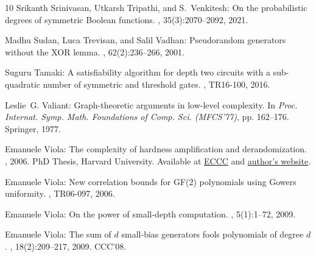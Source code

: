 \documentclass[11pt]{article}
\begin{document}
\begin{thebibliography}{10}
{\sc Srikanth Srinivasan, Utkarsh Tripathi, and S.~Venkitesh}: On the
  probabilistic degrees of symmetric {B}oolean functions.
, 35(3):2070--2092, 2021.

{\sc Madhu Sudan, Luca Trevisan, and Salil Vadhan}: Pseudorandom generators
  without the {XOR} lemma.
, 62(2):236--266, 2001.

{\sc Suguru Tamaki}: A satisfiability algorithm for depth two circuits with a
  sub-quadratic number of symmetric and threshold gates.
, TR16-100, 2016.

{\sc Leslie~G. Valiant}: Graph-theoretic arguments in low-level complexity.
\newblock In {\em Proc. Internat. Symp. Math. Foundations of Comp. Sci.
  (MFCS'77)}, pp. 162--176. Springer, 1977.
\newblock [\epfmtdoi{10.1007/3-540-08353-7\_135}]

{\sc Emanuele Viola}: The complexity of hardness amplification and
  derandomization.
, 2006.
\newblock PhD Thesis, Harvard University. Available at
  \href{https://eccc.weizmann.ac.il/static/books/The_Complexity_of_Hardness_Amplification_and_Derandomization/}{ECCC}
  and \href{https://www.ccs.neu.edu/home/viola/papers/thesis.pdf}{author's
  website}.

{\sc Emanuele Viola}: New correlation bounds for {GF(2)} polynomials using
  {G}owers uniformity.
, TR06-097, 2006.

{\sc Emanuele Viola}: On the power of small-depth computation.
, 5(1):1--72, 2009.
\newblock [\epfmtdoi{10.1561/0400000033}]

{\sc Emanuele Viola}: The sum of $d$ small-bias generators fools polynomials of
  degree $d$.
, 18(2):209--217, 2009.
\newblock \prelim CCC'08.
\newblock [\epfmtdoi{10.1007/s00037-009-0273-5}]


\end{thebibliography}
\end{document}
